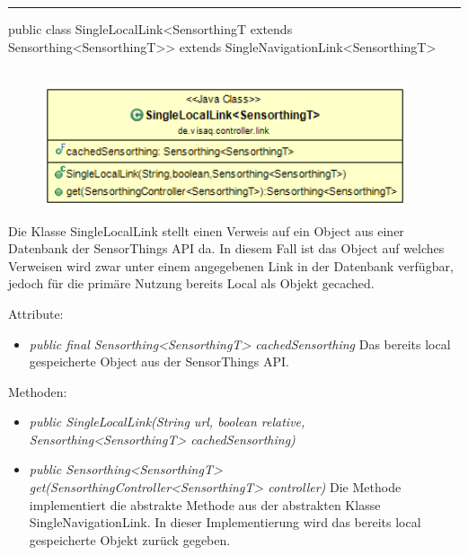 \rule{\textwidth}{0.4pt}
public class SingleLocalLink<SensorthingT extends Sensorthing<SensorthingT>> extends SingleNavigationLink<SensorthingT>
\\\\
\begin{minipage}{0.5\textwidth}
    \begin{figure}[H]
        {\centering\includegraphics[width=0.95\textwidth]{media/backend/controller/classes/SingleLocalLink.png}}
    \end{figure}
    \end{minipage} \hfill
\begin{minipage}{0.5\textwidth}
    Die Klasse SingleLocalLink stellt einen Verweis auf ein Object aus einer Datenbank der \gls{SensorThings API} da.
    In diesem Fall ist das Object auf welches Verweisen wird zwar unter einem angegebenen Link in der Datenbank verfügbar, jedoch für die primäre Nutzung bereits Local als Objekt gecached.
\end{minipage}

Attribute:
\begin{itemize}
    \item \emph{public final Sensorthing<SensorthingT> cachedSensorthing} Das bereits local gespeicherte Object aus der \gls{SensorThings API}.
\end{itemize}
Methoden:
\begin{itemize}
    \item \emph{public SingleLocalLink(String url, boolean relative, Sensorthing<SensorthingT> cachedSensorthing)}
    \relativeDescription
    \item \emph{public Sensorthing<SensorthingT> get(SensorthingController<SensorthingT> controller)}
    Die Methode implementiert die abstrakte Methode aus der abstrakten Klasse SingleNavigationLink. In dieser Implementierung wird das bereits local gespeicherte Objekt zurück gegeben.
\end{itemize}

